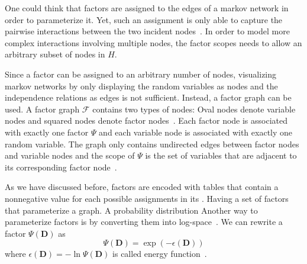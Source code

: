 One could think that \glspl{factor} are assigned to the edges of a \gls{markov network} in order to parameterize it.
Yet, such an assignment is only able to capture the pairwise interactions between the two incident nodes~\citep{koller2009probabilistic}.
In order to model more complex interactions involving multiple nodes, the \glspl{factor scope} needs to allow an arbitrary subset of nodes in $H$.

Since a factor can be assigned to an arbitrary number of nodes, visualizing \glspl{markov network} by only displaying the random variables as nodes and the independence relations as edges is not sufficient.
Instead, a \gls{factor graph} can be used.
A \gls{factor graph} $\mathcal{F}$ contains two types of nodes: Oval nodes denote variable nodes and squared nodes denote factor nodes~\citep{koller2009probabilistic}.
Each factor node is associated with exactly one factor $\Psi$ and each variable node is associated with exactly one random variable.
The graph only contains undirected edges between factor nodes and variable nodes and the scope of $\Psi$ is the set of variables that are adjacent to its corresponding factor node~\citep{koller2009probabilistic}.

As we have discussed before, \glspl{factor} are encoded with tables that contain a nonnegative value for each possible assignments in its .
Having a set of \glspl{factor} that parameterize a graph. A probability distribution
Another way to parameterize \glspl{factor} is by converting them into log-space~\citep{koller2009probabilistic}.
We can rewrite a factor $\Psi(\mathbf{D})$ as
\begin{equation*}
  \label{equ:energy-function}
  \Psi(\mathbf{D}) = \exp(-\epsilon(\mathbf{D}))
\end{equation*}
where $\epsilon(\mathbf{D})=-\ln\Psi(\mathbf{D})$ is called \gls{energy function}~\citep{koller2009probabilistic}.

